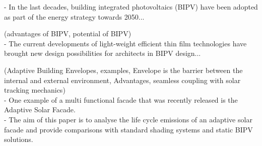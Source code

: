 
- In the last decades, building integrated photovoltaics (BIPV) have been adopted as part of the energy strategy towards 2050... \

(advantages of BIPV, potential of BIPV)\\

- The current developments of light-weight efficient thin film technologies have brought new design possibilities for architects in BIPV design... \

(Adaptive Building Envelopes, examples, Envelope is the barrier between the internal and external environment, Advantages, seamless coupling with solar tracking mechanics) \\

- One example of a multi functional facade that was recently released is the Adaptive Solar Facade.\\

- The aim of this paper is to analyse the life cycle emissions of an adaptive solar facade and provide comparisons with standard shading systems and static BIPV solutions.\\
